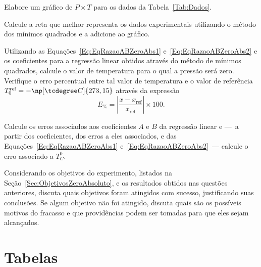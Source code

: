 \begin{question}[type={exam}]{1.5}
Elabore um gráfico de $P \times T$ para os dados da Tabela~\ref{Tab:Dados}.
\end{question}

\begin{question}[type={exam}]{1}
Calcule a reta que melhor representa os dados experimentais utilizando o método dos mínimos quadrados e a adicione ao gráfico.
\end{question}

\begin{question}[type={exam}]{1}
Utilizando as Equações~\ref{Eq:EqRazaoABZeroAbs1} e~\ref{Eq:EqRazaoABZeroAbs2} e os coeficientes para a regressão linear obtidos através do método de mínimos quadrados, calcule o valor de temperatura para o qual a pressão será zero. Verifique o erro percentual entre tal valor de temperatura e o valor de referência $T_0^{\textrm{ref}} = -\np[\tcdegree C]{273,15}$ através da expressão
\begin{equation}
	E_{\%} = \left|\frac{x-x_{\textrm{ref}}}{x_{\textrm{ref}}}\right| \times 100.
\end{equation}
\end{question}

\begin{question}[type={exam}]{2}
Calcule os erros associados aos coeficientes $A$ e $B$ da regressão linear e ---~a partir dos coeficientes, dos erros a eles associados, e das Equações~\ref{Eq:EqRazaoABZeroAbs1} e~\ref{Eq:EqRazaoABZeroAbs2}~---  calcule o erro associado a $T_C^0$.
\end{question}

\begin{question}[type={exam}]{1.5}
Considerando os objetivos do experimento, listados na Seção~\ref{Sec:ObjetivosZeroAbsoluto}, e os resultados obtidos nas questões anteriores, discuta quais objetivos foram atingidos com sucesso, justificando suas conclusões. Se algum objetivo não foi atingido, discuta quais são os possíveis motivos do fracasso e que providências podem ser tomadas para que eles sejam alcançados.
\end{question}

\section{Tabelas}

